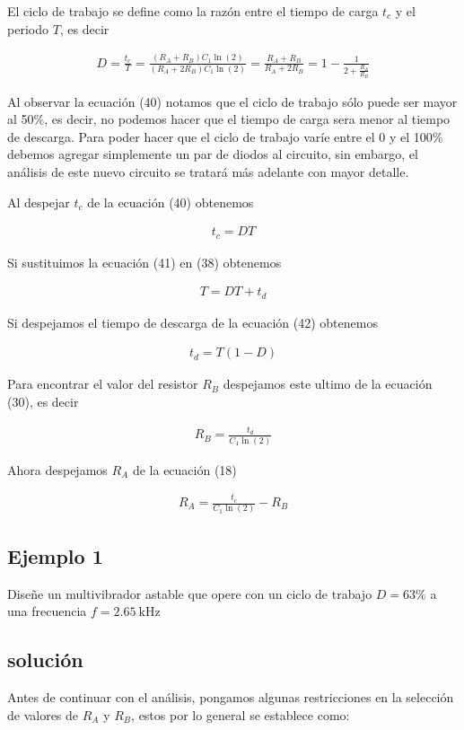 \documentclass{article}
\begin{document}
El ciclo de trabajo se define como la razón entre el tiempo de carga $t_c$ y el periodo $T$, es decir

\begin{align}
	D = \frac{t_c}{T} = \frac{(R_A + R_B)C_1\ln(2)}{(R_A + 2R_B)C_1\ln(2)} = \frac{R_A + R_B}{R_A + 2R_B} = 1 - \frac{1}{2 + \frac{R_A}{R_B}}
\end{align}

Al observar la ecuación (40) notamos que el ciclo de trabajo sólo puede ser mayor al 50\%, es decir, no podemos hacer que el tiempo de carga sera menor al tiempo de descarga. Para poder hacer que el ciclo de trabajo varíe entre el 0 y el 100\% debemos agregar simplemente un par de diodos al circuito, sin embargo, el análisis de este nuevo circuito se tratará más adelante con mayor detalle.

Al despejar $t_c$ de la ecuación (40) obtenemos

\begin{align}
	t_c = DT
\end{align}

Si sustituimos la ecuación (41) en (38) obtenemos

\begin{align}
	T = DT + t_d
\end{align}

Si despejamos el tiempo de descarga de la ecuación (42) obtenemos

\begin{align}
	t_d = T(1 - D)
\end{align}

Para encontrar el valor del resistor $R_B$ despejamos este ultimo de la ecuación (30), es decir

\begin{align}
	R_B = \frac{t_d}{C_1 \ln(2)}
\end{align}

Ahora despejamos $R_A$ de la ecuación (18)

\begin{align}
	R_A = \frac{t_c}{C_1 \ln(2)} - R_B
\end{align}

\subsection*{Ejemplo 1}
Diseñe un multivibrador astable que opere con un ciclo de trabajo $D=63\%$ a una frecuencia $f=\qty{2.65}{\kilo\hertz}$

\subsection*{solución}
Antes de continuar con el análisis, pongamos algunas restricciones en la selección de valores de $R_A$ y $R_B$, estos por lo general se establece como:
\end{document}
